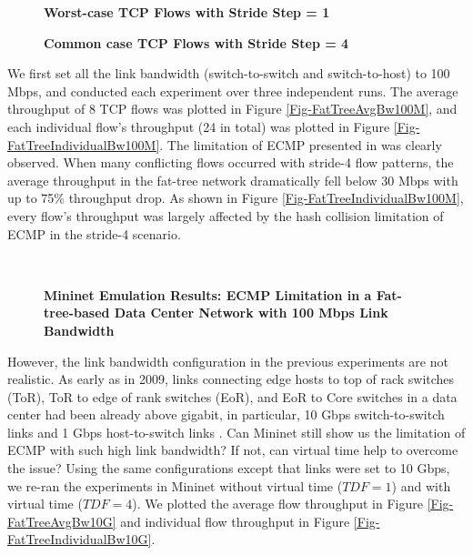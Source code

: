 \begin{figure*}[htbp]
\centering
{}
\caption{\textbf{Worst-case TCP Flows with Stride Step = 1}}
\label{Fig-FattreeTopoExampleStride1}
\end{figure*}

\begin{figure*}[htbp]
\centering
{}
\caption{\textbf{Common case TCP Flows with Stride Step = 4}}
\label{Fig-FattreeTopoExampleStride4}
\end{figure*}

We first set all the link bandwidth (switch-to-switch and switch-to-host) to 100 Mbps, and conducted each experiment over three independent runs. The average throughput of 8 TCP flows was plotted in Figure \ref{Fig-FatTreeAvgBw100M}, and each individual flow's throughput (24 in total) was plotted in Figure \ref{Fig-FatTreeIndividualBw100M}. The limitation of ECMP presented in \cite{Hedera} was clearly observed. When many conflicting flows occurred with stride-4 flow patterns, the average throughput in the fat-tree network dramatically fell below 30 Mbps with up to 75\% throughput drop. As shown in Figure \ref{Fig-FatTreeIndividualBw100M}, every flow's throughput was largely affected by the hash collision limitation of ECMP in the stride-4 scenario.

\begin{figure*}[htbp]
\centering
	~
\caption{\textbf{Mininet Emulation Results: ECMP Limitation in a Fat-tree-based Data Center Network with 100 Mbps Link Bandwidth}}
\end{figure*}

However, the link bandwidth configuration in the previous experiments are not realistic. As early as in 2009, links connecting edge hosts to top of rack switches (ToR), ToR to edge of rank switches (EoR), and EoR to Core switches in a data center had been already above gigabit, in particular, 10 Gbps switch-to-switch links and 1 Gbps host-to-switch links \cite{ScaleEffDCN}. Can Mininet still show us the limitation of ECMP with such high link bandwidth? If not, can virtual time help to overcome the issue? Using the same configurations except that links were set to 10 Gbps, we re-ran the experiments in Mininet without virtual time ($TDF=1$) and with virtual time ($TDF = 4$). We plotted the average flow throughput in Figure \ref{Fig-FatTreeAvgBw10G} and individual flow throughput in Figure \ref{Fig-FatTreeIndividualBw10G}.

